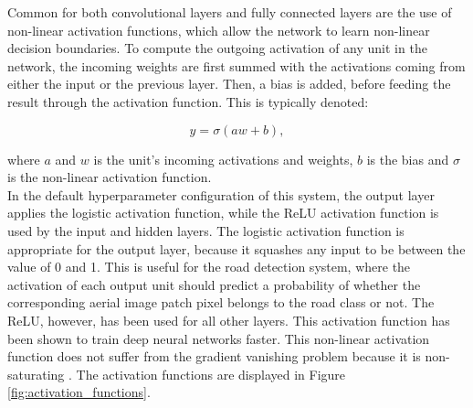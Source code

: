 Common for both convolutional layers and fully connected layers are the use of non-linear activation functions, which allow the network to learn non-linear decision boundaries. To compute the outgoing activation of any unit in the network, the incoming weights are first summed with the activations coming from either the input or the previous layer. Then, a bias is added, before feeding the result through the activation function. This is typically denoted:

$$ y = \sigma(aw + b),$$

\noindent where $a$ and  $w$ is the unit's incoming activations and weights, $b$ is the bias and $\sigma$ is the non-linear activation function.\\

In the default hyperparameter configuration of this system, the output layer applies the logistic activation function, while the \ac{ReLU} activation function is used by the input and hidden layers. The logistic activation function is appropriate for the output layer, because it squashes any input to be between the value of 0 and 1. This is useful for the road detection system, where the activation of each output unit should predict a probability of whether the corresponding aerial image patch pixel belongs to the road class or not. The \ac{ReLU}, however, has been used for all other layers. This activation function has been shown to train deep neural networks faster. This non-linear activation function does not suffer from the gradient vanishing problem because it is non-saturating \citep{Krizhevsky_imagenet}. The activation functions are displayed in Figure \ref{fig:activation_functions}.\\

